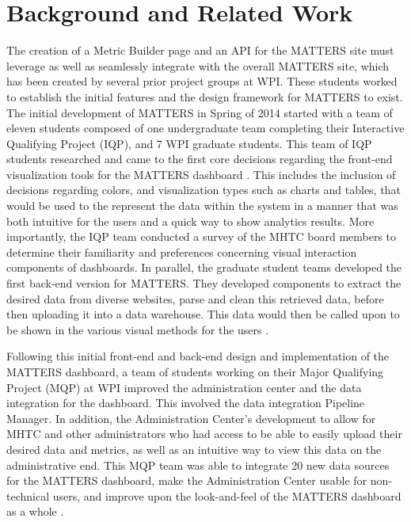 \chapter{Background and Related Work}

	The creation of a Metric Builder page and an API for the MATTERS site must leverage as well as 
	seamlessly integrate with the overall MATTERS site, which has been created by 
	several prior project groups at WPI. These students worked to establish the initial features 
	and the design framework for MATTERS to exist. The initial development of MATTERS in Spring of 2014 
	started with a team of eleven students composed of one undergraduate team completing their Interactive Qualifying Project (IQP), 
	and 7 WPI graduate students. This team of IQP students researched 
	and came to the first core decisions regarding the front-end visualization tools for 
	the MATTERS dashboard \cite{prevreport}. This includes the inclusion of decisions 
	regarding colors, and visualization types such as charts and tables, that would 
	be used to the represent the data within the system in a manner that was both 
	intuitive for the users and a quick way to show analytics results. More importantly, the IQP 
	team conducted a survey of the MHTC board members to determine their familiarity and 
	preferences concerning visual interaction components of dashboards. In parallel, 
	the graduate student teams developed the first back-end version for MATTERS. 
	They developed components to extract the desired data from diverse websites, 
	parse and clean this retrieved data, before then uploading it into a 
	data warehouse. This data would then be called upon to be shown in the various visual 
	methods for the users \cite{iqp}.

	Following this initial front-end and back-end design and implementation 
	of the MATTERS dashboard, a team of students working on their Major Qualifying 
	Project (MQP) at WPI improved the administration center and the 
	data integration for the dashboard. This involved the data integration Pipeline 
	Manager. In addition, the Administration Center's development to allow for MHTC 
	and other administrators who had access to be able to easily upload their 
	desired data and metrics, as well as an intuitive way to view this data on the 
	administrative end. This MQP team was able to integrate 20 new data sources 
	for the MATTERS dashboard, make the Administration Center usable for 
	non-technical users, and improve upon the look-and-feel of the MATTERS 
	dashboard as a whole \cite{iqp}.

